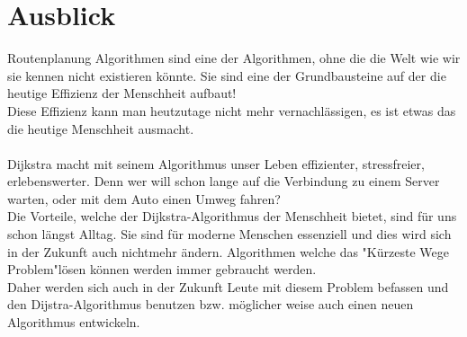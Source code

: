 \chapter{Ausblick}

Routenplanung Algorithmen sind eine der Algorithmen, ohne die die Welt wie wir sie kennen nicht existieren könnte. Sie sind eine der Grundbausteine auf der die heutige Effizienz der Menschheit aufbaut! \\ 
Diese Effizienz kann man heutzutage nicht mehr vernachlässigen, es ist etwas das die heutige Menschheit ausmacht. \\
\\
Dijkstra macht mit seinem Algorithmus unser Leben effizienter, stressfreier, erlebenswerter. Denn wer will schon lange auf die Verbindung zu einem Server warten, oder mit dem Auto einen Umweg fahren? \\
Die Vorteile, welche der Dijkstra-Algorithmus der Menschheit bietet, sind für uns schon längst Alltag. Sie sind für moderne Menschen essenziell und dies wird sich in der Zukunft auch nichtmehr ändern. Algorithmen welche das "Kürzeste Wege Problem"lösen können werden immer gebraucht werden. \\
Daher werden sich auch in der Zukunft Leute mit diesem Problem befassen und den Dijstra-Algorithmus benutzen bzw. möglicher weise auch einen neuen Algorithmus entwickeln.